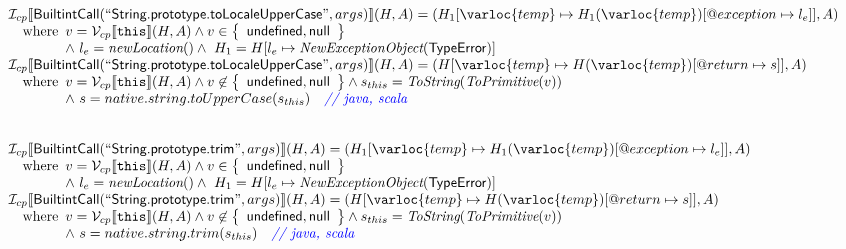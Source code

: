 \[\begin{array}{l}
  
\I _{cp}\lbr \SF{BuiltintCall}(``\SF{String.prototype.toLocaleUpperCase}",args)\rbr(H,A)
 = (H_1[\varloc{temp}\mapsto H_1(\varloc{temp})[\varprop{exception}\mapsto l_e]], A) \\
\quad\wherec{
  v = \V _{cp}\lbr \TT{this}\rbr (H,A) \land v \in \set{\SF{undefined}, \SF{null}}\\
  \land\ l_e = \hf{newLocation}() \land\ H_1=H[l_e\mapsto\hf{NewExceptionObject}(\SF{TypeError})] 
  }\\
  
\I _{cp}\lbr \SF{BuiltintCall}(``\SF{String.prototype.toLocaleUpperCase}",args)\rbr(H,A)
 = (H[\varloc{temp}\mapsto H(\varloc{temp})[\varprop{return}\mapsto s]], A) \\
\quad\wherec{
  v = \V _{cp}\lbr \TT{this}\rbr (H,A) \land v \not\in \set{\SF{undefined}, \SF{null}}
  \land s_{this} = \hf{ToString}(\hf{ToPrimitive}(v))\\
  \land\ s = native.string.toUpperCase(s_{this}) \quad\comment{{\inblue // java, scala}}\\
  }\\
\\\\



\I _{cp}\lbr \SF{BuiltintCall}(``\SF{String.prototype.trim}",args)\rbr(H,A)
 = (H_1[\varloc{temp}\mapsto H_1(\varloc{temp})[\varprop{exception}\mapsto l_e]], A) \\
\quad\wherec{
  v = \V _{cp}\lbr \TT{this}\rbr (H,A) \land v \in \set{\SF{undefined}, \SF{null}}\\
  \land\ l_e = \hf{newLocation}() \land\ H_1=H[l_e\mapsto\hf{NewExceptionObject}(\SF{TypeError})] 
  }\\
  
\I _{cp}\lbr \SF{BuiltintCall}(``\SF{String.prototype.trim}",args)\rbr(H,A)
 = (H[\varloc{temp}\mapsto H(\varloc{temp})[\varprop{return}\mapsto s]], A) \\
\quad\wherec{
  v = \V _{cp}\lbr \TT{this}\rbr (H,A) \land v \not\in \set{\SF{undefined}, \SF{null}}
  \land s_{this} = \hf{ToString}(\hf{ToPrimitive}(v))\\
  \land\ s = native.string.trim(s_{this}) \quad\comment{{\inblue // java, scala}}\\
  }\\
\\\\
\end{array}
\]




